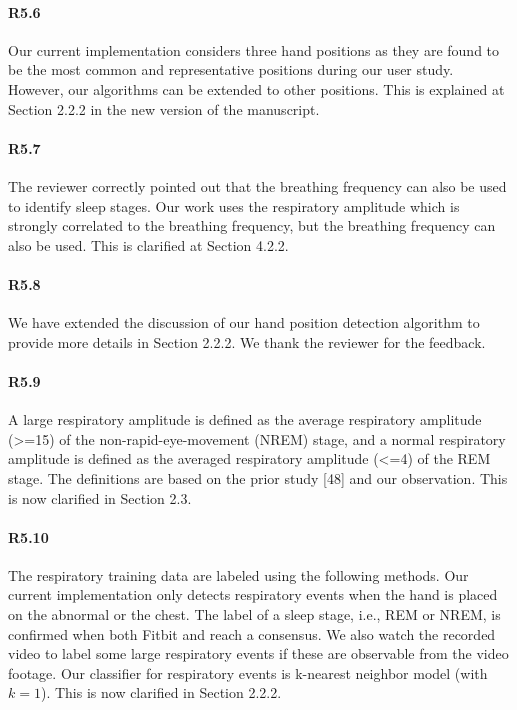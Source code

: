 \paragraph{R5.6} Our current implementation considers three hand positions as they are found to be the most common and representative
positions during our user study. However, our algorithms can be extended to other positions. This is explained at Section 2.2.2 in the new
version of the manuscript.

\paragraph{R5.7} The reviewer correctly pointed out that the breathing frequency can also be used to identify sleep stages. Our work uses
the respiratory amplitude which is strongly correlated to the breathing frequency, but the breathing frequency can also be used. This is
clarified at Section 4.2.2.

\paragraph{R5.8} We have extended the discussion of our hand position detection algorithm to provide more details in Section 2.2.2. We
thank the reviewer for the feedback.

\paragraph{R5.9} A large respiratory amplitude is defined as the average respiratory amplitude (>=15) of the
non-rapid-eye-movement (NREM) stage, and a normal respiratory amplitude is defined as the averaged respiratory amplitude (<=4) of the REM
stage. The definitions are based on the prior study [48] and our observation. This is now clarified in Section 2.3.


\paragraph{R5.10} The respiratory training data are labeled using the following methods. Our current implementation only detects
respiratory events when the hand is placed on the abnormal or the chest. The label of a sleep stage, i.e., REM or NREM, is confirmed when
both Fitbit and \systemname reach a consensus. We also watch the recorded video to label some large respiratory events if these are
observable from the video footage. Our classifier for respiratory events is k-nearest neighbor model (with $k=1$). This is now clarified in
Section 2.2.2.


